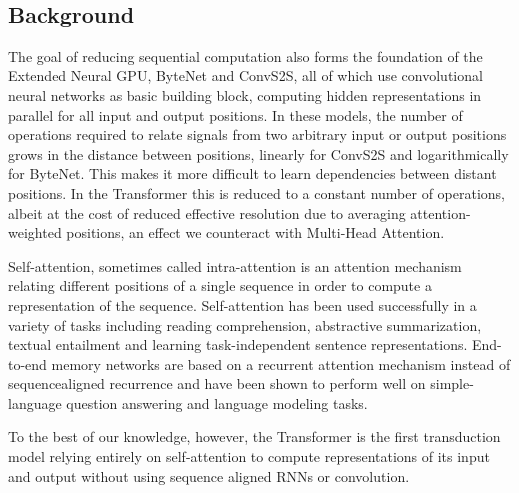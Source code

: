 \documentclass[11pt,a4paper]{article}
\begin{document}
    \noindent
    \begin{tiny}

    \begin{center}
    \end{center}
    { \hspace*{\fill} \\}

       \end{tiny}\begin{quoting}
\section{Background}\label{background}
     \end{quoting}\begin{quoting}
The goal of reducing sequential computation also forms the foundation of
the Extended Neural GPU, ByteNet and ConvS2S, all of which use
convolutional neural networks as basic building block, computing hidden
representations in parallel for all input and output positions. In these
models, the number of operations required to relate signals from two
arbitrary input or output positions grows in the distance between
positions, linearly for ConvS2S and logarithmically for ByteNet. This
makes it more difficult to learn dependencies between distant positions.
In the Transformer this is reduced to a constant number of operations,
albeit at the cost of reduced effective resolution due to averaging
attention-weighted positions, an effect we counteract with Multi-Head
Attention.

Self-attention, sometimes called intra-attention is an attention
mechanism relating different positions of a single sequence in order to
compute a representation of the sequence. Self-attention has been used
successfully in a variety of tasks including reading comprehension,
abstractive summarization, textual entailment and learning
task-independent sentence representations. End-to-end memory networks
are based on a recurrent attention mechanism instead of sequencealigned
recurrence and have been shown to perform well on simple-language
question answering and language modeling tasks.

To the best of our knowledge, however, the Transformer is the first
transduction model relying entirely on self-attention to compute
representations of its input and output without using sequence aligned
RNNs or convolution.
     \end{quoting}\begin{quoting}

\end{quoting}
\end{document}
